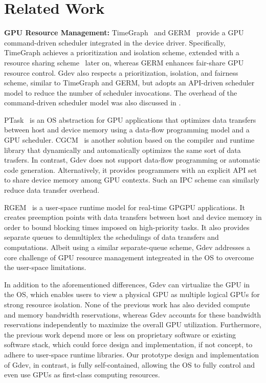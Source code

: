 \vspace{-0.25em}
\section{Related Work}
\label{sec:related_work}
\vspace{-0.25em}

\textbf{GPU Resource Management:}
TimeGraph~\cite{Kato_ATC11} and GERM~\cite{Bautin_MCNC08} provide a GPU
command-driven scheduler integrated in the device driver.
Specifically, TimeGraph achieves a prioritization and isolation scheme,
extended with a resource sharing scheme~\cite{Kato_RTAS11} later on,
whereas GERM enhances fair-share GPU resource control.
Gdev also respects a prioritization, isolation, and fairness scheme,
similar to TimeGraph and GERM, but adopts an API-driven scheduler model
to reduce the number of scheduler invocations.
The overhead of the command-driven scheduler model was
also discussed in \cite{Kato_ATC11}.


PTask~\cite{Rossbach_SOSP11} is an OS abstraction for GPU applications
that optimizes data transfers between host and device memory using
a data-flow programming model and a GPU scheduler.
CGCM~\cite{Jablin_PLDI11} is another solution based on the compiler and
runtime library that dynamically and automatically optimizes the same
sort of data trasfers.
In contrast, Gdev does not support data-flow programming or automatic
code generation.
Alternatively, it provides programmers with an explicit API set to share
device memory among GPU contexts.
Such an IPC scheme can similarly reduce data transfer overhead.

RGEM~\cite{Kato_RTSS11} is a user-space runtime model for real-time
GPGPU applications.
It creates preemption points with data transfers between host and device
memory in order to bound blocking times imposed on high-priority tasks.
It also provides separate queues to demultiplex the schedulings of data
transfers and computations.
Albeit using a similar separate-queue scheme, Gdev addresses a core
challenge of GPU resource management integreated in the OS to overcome
the user-space limitations.

In addition to the aforementioned differences, Gdev can virtualize the
GPU in the OS, which enables users to view a physical GPU as multiple
logical GPUs for strong resource isolation.
None of the previous work has also devided compute and memory
bandwidth reservations, whereas Gdev accounts for these bandwidth
reservations independently to maximize the overall GPU utilization.
Furthermore, the previous work depend more or less on proprietary
software or existing software stack, which could force design and
implementation, if not concept, to adhere to user-space runtime
libraries.
Our prototype design and implementation of Gdev, in contrast, is fully
self-contained, allowing the OS to fully control and even use GPUs as
first-class computing resources.


